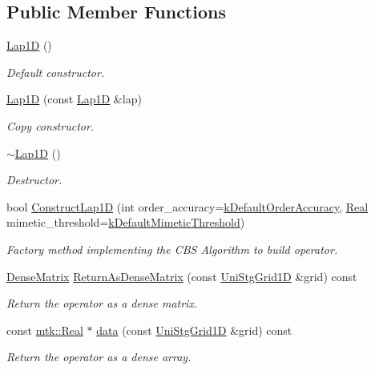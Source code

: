 \subsection*{Public Member Functions}
\begin{DoxyCompactItemize}
\item 
\hyperlink{classmtk_1_1Lap1D_a6fc2aeea35d4dfa49f17e625411f5a70}{Lap1\+D} ()
\begin{DoxyCompactList}\small\item\em Default constructor. \end{DoxyCompactList}\item 
\hyperlink{classmtk_1_1Lap1D_a95c3fdcd0c9e4c56e775a2a20a2fac42}{Lap1\+D} (const \hyperlink{classmtk_1_1Lap1D}{Lap1\+D} \&lap)
\begin{DoxyCompactList}\small\item\em Copy constructor. \end{DoxyCompactList}\item 
\hyperlink{classmtk_1_1Lap1D_ac0cb868243a66658cc46de5b818fa4e8}{$\sim$\+Lap1\+D} ()
\begin{DoxyCompactList}\small\item\em Destructor. \end{DoxyCompactList}\item 
bool \hyperlink{classmtk_1_1Lap1D_a685dcba88c08cf5b7b6c2aa4669a472c}{Construct\+Lap1\+D} (int order\+\_\+accuracy=\hyperlink{group__c01-roots_ga0d95560098eb36420511103637b6952f}{k\+Default\+Order\+Accuracy}, \hyperlink{group__c01-roots_gac080bbbf5cbb5502c9f00405f894857d}{Real} mimetic\+\_\+threshold=\hyperlink{group__c01-roots_ga35718d949bdc81a08a9cc8ebbe3478a2}{k\+Default\+Mimetic\+Threshold})
\begin{DoxyCompactList}\small\item\em Factory method implementing the C\+B\+S Algorithm to build operator. \end{DoxyCompactList}\item 
\hyperlink{classmtk_1_1DenseMatrix}{Dense\+Matrix} \hyperlink{classmtk_1_1Lap1D_aaea34a17b0879e05eb4109645a2ba8f4}{Return\+As\+Dense\+Matrix} (const \hyperlink{classmtk_1_1UniStgGrid1D}{Uni\+Stg\+Grid1\+D} \&grid) const 
\begin{DoxyCompactList}\small\item\em Return the operator as a dense matrix. \end{DoxyCompactList}\item 
const \hyperlink{group__c01-roots_gac080bbbf5cbb5502c9f00405f894857d}{mtk\+::\+Real} $\ast$ \hyperlink{classmtk_1_1Lap1D_ab2652725a8407c79247680c7bbd073b8}{data} (const \hyperlink{classmtk_1_1UniStgGrid1D}{Uni\+Stg\+Grid1\+D} \&grid) const 
\begin{DoxyCompactList}\small\item\em Return the operator as a dense array. \end{DoxyCompactList}\end{DoxyCompactItemize}

